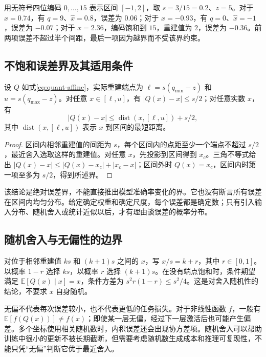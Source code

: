 \documentclass[UTF8,12pt,a4paper,fontset=fandol]{ctexart}
\begin{document}
\begin{example}[带零点的四位量化]
用无符号四位编码 $0,\ldots,15$ 表示区间 $[-1,2]$，取 $s=3/15=0.2$、$z=5$。对于 $x=0.74$，有 $q=9$、$\widehat x=0.8$，误差为 $0.06$；对于 $x=-0.93$，有 $q=0$、$\widehat x=-1$，误差为 $-0.07$；对于 $x=2.36$，编码饱和到 $15$，重建值为 $2$，误差为 $-0.36$。前两项误差不超过半个间距，最后一项因为越界而不受该界约束。
\end{example}

\subsection{不饱和误差界及其适用条件}
\begin{proposition}[最近网格投影的误差界]
设 $Q$ 如式\eqref{eq:quant-affine}，实际重建端点为 $\ell=s(q_{\min}-z)$ 和 $u=s(q_{\max}-z)$。对任意 $x\in[\ell,u]$，有 $|Q(x)-x|\leq s/2$；对任意实数 $x$，有
\begin{equation}
 |Q(x)-x|\leq \operatorname{dist}(x,[\ell,u])+s/2,
 \label{eq:quant-pointwise-bound}
\end{equation}
其中 $\operatorname{dist}(x,[\ell,u])$ 表示 $x$ 到区间的最短距离。
\end{proposition}
\begin{proof}
区间内相邻重建值的间距为 $s$，每个区间内的点距至少一个端点不超过 $s/2$，最近舍入选取这样的重建值。对任意 $x$，先投影到区间得到 $x_c$。三角不等式给出 $|Q(x)-x|\leq|Q(x)-x_c|+|x_c-x|$；区间外时 $Q(x)=x_c$，区间内时第一项至多为 $s/2$，得到所述界。
\end{proof}
该结论是绝对误差界，不能直接推出模型准确率变化的界。它也没有断言所有误差在区间内均匀分布。给定确定权重和确定尺度，每个误差都是确定数；只有引入输入分布、随机舍入或统计近似以后，才有理由谈误差的概率分布。

\subsection{随机舍入与无偏性的边界}
对位于相邻重建值 $ks$ 和 $(k+1)s$ 之间的 $x$，写 $x/s=k+r$，其中 $r\in[0,1]$。以概率 $1-r$ 选择 $ks$，以概率 $r$ 选择 $(k+1)s$。在没有端点饱和时，条件期望满足 $\mathbb E[Q(x)\mid x]=x$，条件方差为 $s^2r(1-r)\leq s^2/4$。这是对舍入随机性的结论，不要求 $x$ 自身随机。

无偏不代表每次误差较小，也不代表更低的任务损失。对于非线性函数 $f$，一般有 $\mathbb E[f(Q(x))]\ne f(x)$；即使某一层无偏，经过下一层激活后也可能产生偏差。多个坐标使用相关随机数时，内积误差还会出现协方差项。随机舍入可以帮助训练中很小的更新不被长期截断，但需要考虑随机数生成成本和推理可复现性，不能只凭“无偏”判断它优于最近舍入。
\end{document}
